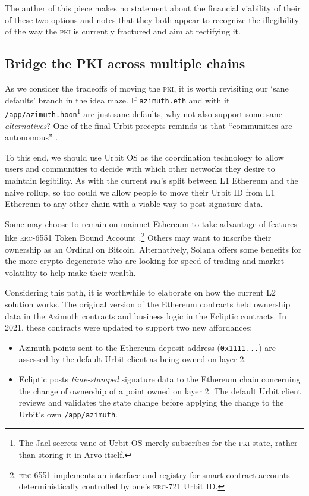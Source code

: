 \documentclass[twoside]{article}
\begin{document}
The auther of this piece makes no statement about the financial viability of their of these two options and notes that they both appear to recognize the illegibility of the way the \textsc{pki} is currently fractured and aim at rectifying it.

\subsection[Bridge the \textsc{pki} across multiple chains]{Bridge the PKI across multiple chains}

\sloppy
As we consider the tradeoffs of moving the \textsc{pki}, it is worth revisiting our `sane defaults' branch in the idea maze. If \lstinline[style=inlinecode]{azimuth.eth} and with it \lstinline[style=inlinecode]{/app/azimuth.hoon}\footnote{The Jael secrets vane of Urbit OS merely subscribes for the \textsc{pki} state, rather than storing it in Arvo itself.} are just sane defaults, why not also support some sane \emph{alternatives}? One of the final Urbit precepts reminds us that ``communities are autonomous'' \citep{UrbitPrecepts}.

To this end, we should use Urbit OS as the coordination technology to allow users and communities to decide with which other networks they desire to maintain legibility. As with the current \textsc{pki}'s split between L1 Ethereum and the naive rollup, so too could we allow people to move their Urbit ID from L1 Ethereum to any other chain with a viable way to post signature data.

Some may choose to remain on mainnet Ethereum to take advantage of features like \textsc{erc}-6551 Token Bound Account \citep{EIP6551}.\footnote{\textsc{erc}-6551 implements an interface and registry for smart contract accounts deterministically controlled by one's \textsc{erc}-721 Urbit ID.} Others may want to inscribe their ownership as an Ordinal on Bitcoin. Alternatively, Solana offers some benefits for the more crypto-degenerate who are looking for speed of trading and market volatility to help make their wealth. 

Considering this path, it is worthwhile to elaborate on how the current L2 solution works. The original version of the Ethereum contracts held ownership data in the Azimuth contracts and business logic in the Ecliptic contracts. In 2021, these contracts were updated to support two new affordances:

\begin{itemize}
  \item  Azimuth points sent to the Ethereum deposit address (\lstinline[style=inlinecode]{0x1111...}) are assessed by the default Urbit client as being owned on layer 2.
  \item  Ecliptic posts \emph{time-stamped} signature data to the Ethereum chain concerning the change of ownership of a point owned on layer 2.  The default Urbit client reviews and validates the state change before applying the change to the Urbit's own \lstinline[style=inlinecode]{/app/azimuth}.
\end{itemize}
\end{document}
